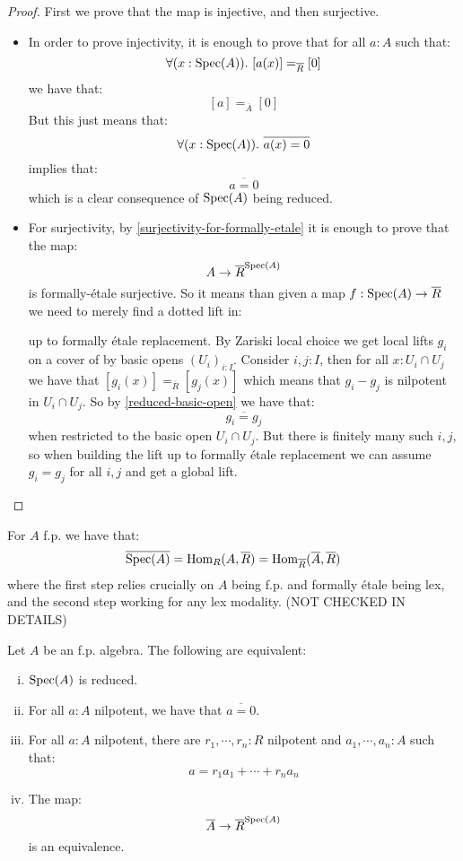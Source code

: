 \begin{proof}
First we prove that the map is injective, and then surjective.
\begin{itemize}

\item In order to prove injectivity, it is enough to prove that for all $a:A$ such that:
\[\forall (x:\operatorname{Spec}(A)).\ [a(x)] =_{\overline{R}} [0]\]
we have that:
\[[a] =_{\overline{A}} [0]\]
But this just means that:
\[\forall (x:\operatorname{Spec}(A)).\ \overline{a(x)=0}\]
implies that:
\[\overline{a=0}\]
which is a clear consequence of $\operatorname{Spec}(A)$ being reduced.

\item For surjectivity, by \cref{surjectivity-for-formally-etale} it is enough to prove that the map:
\[A\to \overline{R}^{\operatorname{Spec}(A)}\]
is formally-étale surjective. So it means than given a map $f: \operatorname{Spec}(A)\to \overline{R}$ we need to merely find a dotted lift in:
 \begin{center}
    \end{center}
up to formally étale replacement. By Zariski local choice we get local lifts $g_i$ on a cover of by basic opens $(U_i)_{i:I}$. Consider $i,j:I$, then for all $x:U_i\cap U_j$ we have that $[g_i(x)] =_{\overline{R}} [g_j(x)]$ which means that $g_i-g_j$ is nilpotent in $U_i\cap U_j$. So by \cref{reduced-basic-open} we have that:
\[\overline{g_i = g_j}\]
when restricted to the basic open $U_i\cap U_j$. But there is finitely many such $i,j$, so when building the lift up to formally étale replacement we can assume $g_i = g_j$ for all $i,j$ and get a global lift.
\end{itemize}
\end{proof}

\begin{remark}
For $A$ f.p. we have that:
\[\overline{\operatorname{Spec}(A)} = \mathrm{Hom}_{R}(A,\overline{R}) = \mathrm{Hom}_{\overline{R}}(\overline{A},\overline{R})\]
where the first step relies crucially on $A$ being f.p. and formally étale being lex, and the second step working for any lex modality. (NOT CHECKED IN DETAILS)
\end{remark}

\begin{theorem}\label{reduced-affine}
Let $A$ be an f.p. algebra. The following are equivalent:
\begin{enumerate}[(i)]
\item $\operatorname{Spec}(A)$ is reduced.
\item For all $a:A$ nilpotent, we have that $\overline{a=0}$.
\item\label{reduced-affine-iii} For all $a:A$ nilpotent, there are $r_1,\cdots,r_n:R$ nilpotent and $a_1,\cdots,a_n:A$ such that:
\[a = r_1a_1+\cdots+r_na_n\]
\item The map:
\[\overline{A}\to \overline{R}^{\operatorname{Spec}(A)}\]
is an equivalence.
\end{enumerate}
\end{theorem}

